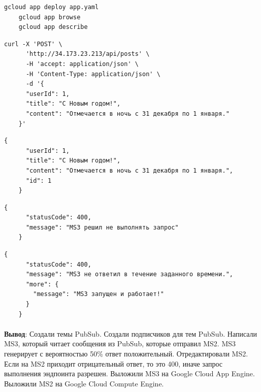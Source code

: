 \documentclass[12pt, a4paper, simple]{eskdtext}
\begin{document}
  \begin{lstlisting}[language=bash,name=Обновление MS3 на Google Cloud App Engine]
    gcloud app deploy app.yaml
    gcloud app browse
    gcloud app describe
  \end{lstlisting}


  \begin{lstlisting}[name=Создаём статью микроблога]
    curl -X 'POST' \
      'http://34.173.23.213/api/posts' \
      -H 'accept: application/json' \
      -H 'Content-Type: application/json' \
      -d '{
      "userId": 1,
      "title": "С Новым годом!",
      "content": "Отмечается в ночь с 31 декабря по 1 января."
    }'
  \end{lstlisting}

  \begin{lstlisting}[name={Если от MS3 к MS2 пришел true, то MS2 вернёт JSON}]
    {
      "userId": 1,
      "title": "С Новым годом!",
      "content": "Отмечается в ночь с 31 декабря по 1 января.",
      "id": 1
    }
  \end{lstlisting}

  \begin{lstlisting}[name={Если от MS3 к MS2 пришел false, то MS2 вернёт JSON}]
    {
      "statusCode": 400,
      "message": "MS3 решил не выполнять запрос"
    }
  \end{lstlisting}

  \begin{lstlisting}[name={Если (за 4000 милисекунд) не успел прийти ответ, то MS2 вернёт JSON}]
    {
      "statusCode": 400,
      "message": "MS3 не ответил в течение заданного времени.",
      "more": {
        "message": "MS3 запущен и работает!"
      }
    }
  \end{lstlisting}

  \newpage

  \paragraph{} \textbf{Вывод}:
  Создали темы PubSub. Создали подписчиков для тем PubSub. Написали MS3, который читает сообщения из PubSub, которые отправил MS2.
  MS3 генерирует с вероятностью 50\% ответ положительный. Отредактировали MS2.
  Если на MS2 приходит отрицательный ответ, то это 400, иначе запрос выполнения эндпоинта разрешен.
  Выложили MS3 на Google Cloud App Engine. Выложили MS2 на Google Cloud Compute Engine.
  
  \begingroup
\end{document}
